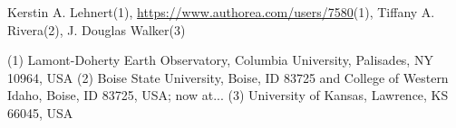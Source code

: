 Kerstin A. Lehnert(1), \href{Leslie Hsu}{https://www.authorea.com/users/7580}(1), Tiffany A. Rivera(2), J. Douglas Walker(3)

(1) Lamont-Doherty Earth Observatory, Columbia University, Palisades, NY 10964, USA
(2) Boise State University, Boise, ID 83725 and College of Western Idaho, Boise, ID 83725, USA; now at...
(3) University of Kansas, Lawrence, KS 66045, USA
